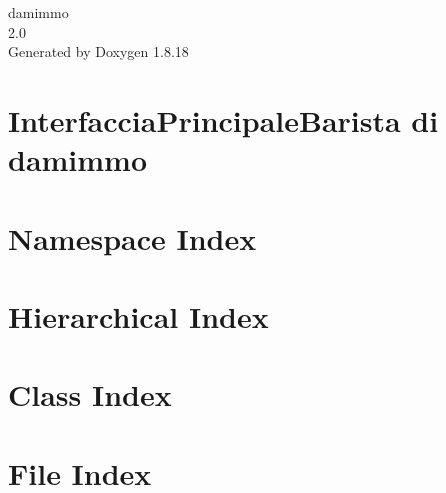 \let\mypdfximage\pdfximage\def\pdfximage{\immediate\mypdfximage}\documentclass[twoside]{book}
\newcommand{\+}{\discretionary{\mbox{\scriptsize$\hookleftarrow$}}{}{}}
\newcommand{\clearemptydoublepage}{%
  \newpage{\pagestyle{empty}\cleardoublepage}%
}
\begin{document}
\hypersetup{pageanchor=false,
             bookmarksnumbered=true,
             pdfencoding=unicode
            }
\begin{titlepage}
\vspace*{7cm}
\begin{center}%
{\Large damimmo \\[1ex]\large 2.\+0 }\\
\vspace*{1cm}
{\large Generated by Doxygen 1.8.18}\\
\end{center}
\end{titlepage}
\clearemptydoublepage
{}
\tableofcontents
\clearemptydoublepage
{}
\hypersetup{pageanchor=true}

\chapter{Interfaccia\+Principale\+Barista di damimmo}
\label{index}\hypertarget{index}{}
\chapter{Namespace Index}

\chapter{Hierarchical Index}

\chapter{Class Index}

\chapter{File Index}

\end{document}
